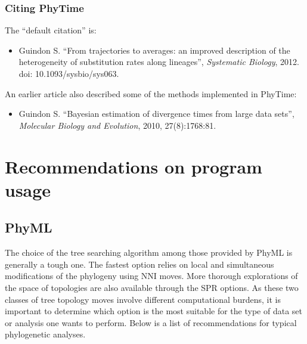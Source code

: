 \documentclass[a4paper,12pt]{article}
\begin{document}
\subsubsection{Citing PhyTime}\label{sec:citephytime}

The ``default citation'' is:

\begin{itemize}
\item Guindon S. ``From trajectories to averages: an improved description of the heterogeneity of
substitution rates along lineages'', {\it Systematic Biology}, 2012. doi: 10.1093/sysbio/sys063.
\end{itemize}

An earlier article also described some of the methods implemented in PhyTime:

\begin{itemize}
\item Guindon  S. ``Bayesian estimation of divergence  times from large data  sets'', {\it Molecular
    Biology and Evolution}, 2010,
27(8):1768:81.
\end{itemize}


\section{Recommendations on program usage}\label{sec:progusage}

\subsection{PhyML}

The choice of the  tree searching algorithm among those provided by PhyML  is generally a tough one.
The  fastest option  relies  on local  and simultaneous  modifications  of the  phylogeny using  NNI
moves. More  thorough explorations of  the space  of topologies are  also available through  the SPR
options.  As these  two classes of tree topology moves involve  different computational burdens, it
is important to determine which option is the most suitable for the type of data set or analysis one
wants to perform. Below is a list of recommendations for typical phylogenetic analyses.
\end{document}
